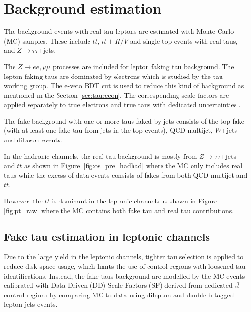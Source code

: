 \section{Background estimation}
\label{sec:background}

%

The background events with real tau leptons are estimated with Monte Carlo (MC) samples. These include $t\bar{t}$, $t\bar{t}+H/V$ and 
single top events with real taus, and $Z\to\tau\tau$+jets.

The $Z\to ee,\mu\mu$ processes are included for lepton faking tau background. The lepton faking taus are dominated by electrons which is studied by the tau working group. The e-veto BDT cut is used to reduce this kind of background as mentioned in the Section \ref{sec:taurecon}. The corresponding scale factors are applied separately to true electrons and true taus with dedicated uncertainties \cite{TauCP}. 

%

The fake background with one or more taus faked by jets consists of the top fake (with at least one fake tau from jets in the top events), QCD multijet, $W$+jets and diboson events.

In the hadronic channels, the real tau background is mostly from $Z\to\tau\tau$+jets and $t\bar t$  as shown in Figure~\ref{fig:os_pre_hadhad} where the MC only includes real taus while the excess of data events consists of fakes from both QCD multijet and $t\bar t$.

However, the $t\bar t$ is dominant in the leptonic channels as shown in Figure \ref{fig:pt_raw} where the MC contains both fake tau and real tau contributions.





\subsection{Fake tau estimation in leptonic channels}
\label{sec:sf_method}

Due to the large yield in the leptonic channels, tighter tau selection is applied to reduce disk space usage, which limits the use of control regions with loosened tau identifications. Instead, the fake taus background are modelled by the MC events calibrated with Data-Driven (DD) Scale Factors (SF) derived from dedicated $t\bar t$ control regions by comparing MC to data using dilepton and double b-tagged lepton jets events.

